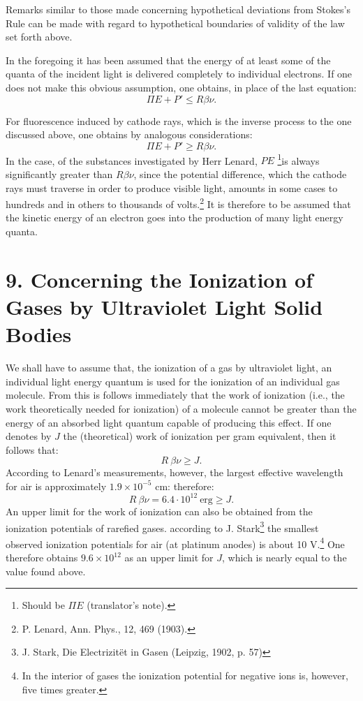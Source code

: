 \documentclass[12pt]{article}
\begin{document}
Remarks similar to those made concerning hypothetical deviations from Stokes's
Rule can be made with regard to hypothetical boundaries 
of validity of the law set forth above.

In the foregoing it has been assumed that the energy of at least some of the
quanta of the incident light is delivered completely to individual electrons. If
one does not make this obvious assumption, one obtains, in place of the last
equation:
$$
\Pi E + P' \leq R \beta \nu.
$$

For fluorescence induced by cathode rays, which is the inverse process to the
one discussed above, one obtains by analogous considerations:
$$
\Pi E + P' \geq R \beta \nu.
$$
In the case, of the substances investigated by 
Herr Lenard, $PE$ \footnote{Should
be $\Pi E$ (translator's note).}is always significantly greater than $R \beta
\nu$, since the potential difference, which the cathode rays must traverse in
order to produce visible light, amounts in some cases to hundreds and in others
to thousands of volts.\footnote{P. Lenard, Ann. Phys., 12, 469 (1903).} It
is therefore to be assumed that the kinetic energy of an electron goes into the
production of many light energy quanta.

\vspace{0.5cm}
\section*{
{\bf 9. Concerning the Ionization of Gases by Ultraviolet Light
Solid Bodies}}
\vspace{0.5cm}

We shall have to assume that, the ionization of a gas by ultraviolet light, an
individual light energy quantum is used for the ionization of an individual gas
molecule. From this is follows immediately that the work of ionization (i.e.,
the work theoretically needed for ionization) of a molecule cannot be greater
than the energy of an absorbed light quantum capable of producing this effect.
If one denotes by $J$ the (theoretical) work of ionization per gram equivalent,
then it follows that:
$$
R ~\beta \nu \geq J.
$$
According to Lenard's measurements, however, the largest  effective wavelength
for air is approximately $1.9 \times 10^{-5}$ cm: therefore:
$$
R ~\beta \nu = 6.4 \cdot 10^{12}~ \mbox{erg} \geq J.
$$
An upper limit for the work of ionization can also be obtained from the
ionization potentials of rarefied gases. according to J. Stark\footnote{J.
Stark, Die Electrizit\"et in Gasen (Leipzig, 1902, p. 57)} the smallest observed
ionization potentials for air (at platinum anodes) is about 10 V.\footnote{In
the interior of gases the ionization potential for negative ions is, however,
five times greater.} One therefore obtains $9.6 \times 10^{12}$ as an upper limit
for $J$, which is nearly equal to the value found above.
\end{document}
